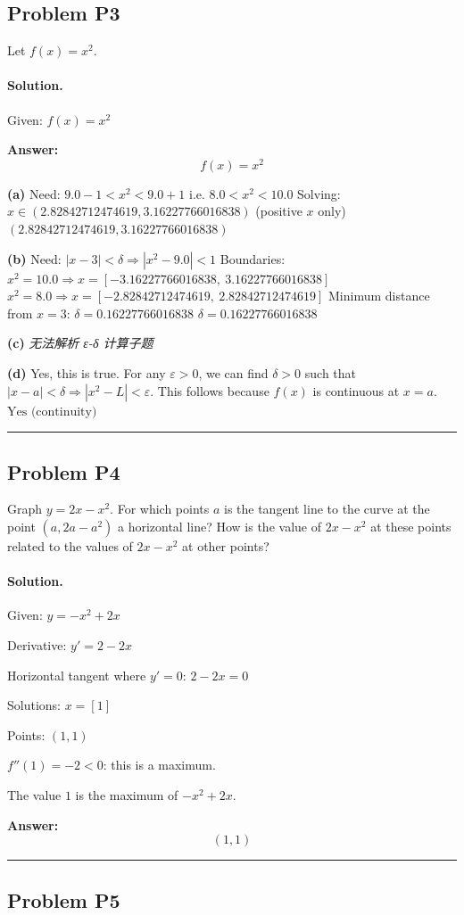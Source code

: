 \documentclass[12pt, a4paper]{article}
\newcommand{\problem}[1]{\subsection*{Problem #1}}
\newcommand{\solution}{\paragraph{Solution.}}
\begin{document}
\problem{P3}

Let $f(x) = x^2$.

\solution

Given: $f(x) = x^{2}$

\textbf{Answer:}
\[\boxed{f(x) = x^{2}}\]

\textbf{(a)}
Need: $9.0 - 1 < x^{2} < 9.0 + 1$
i.e. $8.0 < x^{2} < 10.0$
Solving: $x \in (2.82842712474619, 3.16227766016838)$ (positive $x$ only)
$\boxed{(2.82842712474619, 3.16227766016838)}$

\textbf{(b)}
Need: $|x - 3| < \delta \Rightarrow |x^{2} - 9.0| < 1$
Boundaries: $x^{2} = 10.0 \Rightarrow x = \left[ -3.16227766016838, \  3.16227766016838\right]$
           $x^{2} = 8.0 \Rightarrow x = \left[ -2.82842712474619, \  2.82842712474619\right]$
Minimum distance from $x = 3$: $\delta = 0.16227766016838$
$\boxed{\delta = 0.16227766016838}$

\textbf{(c)}
\textit{\color{red} 无法解析 ε-δ 计算子题}

\textbf{(d)}
Yes, this is true.
For any $\varepsilon > 0$, we can find $\delta > 0$ such that
$|x - a| < \delta \Rightarrow |x^{2} - L| < \varepsilon$.
This follows because $f(x)$ is continuous at $x = a$.
$\boxed{\text{Yes (continuity)}}$

\vspace{1em}
\hrule
\vspace{1em}

\problem{P4}

Graph $y = 2x - x^2$. For which points $a$ is the tangent line to the curve at the point $(a, 2a - a^2)$ a horizontal line? How is the value of $2x - x^2$ at these points related to the values of $2x - x^2$ at other points?

\solution

Given: $y = - x^{2} + 2 x$

Derivative: $y' = 2 - 2 x$

Horizontal tangent where $y' = 0$: $2 - 2 x = 0$

Solutions: $x = \left[ 1\right]$

Points: $(1, 1)$

$f''(1) = -2 < 0$: this is a maximum.

The value $1$ is the maximum of $- x^{2} + 2 x$.

\textbf{Answer:}
\[\boxed{(1, 1)}\]

\vspace{1em}
\hrule
\vspace{1em}

\problem{P5}
\end{document}
